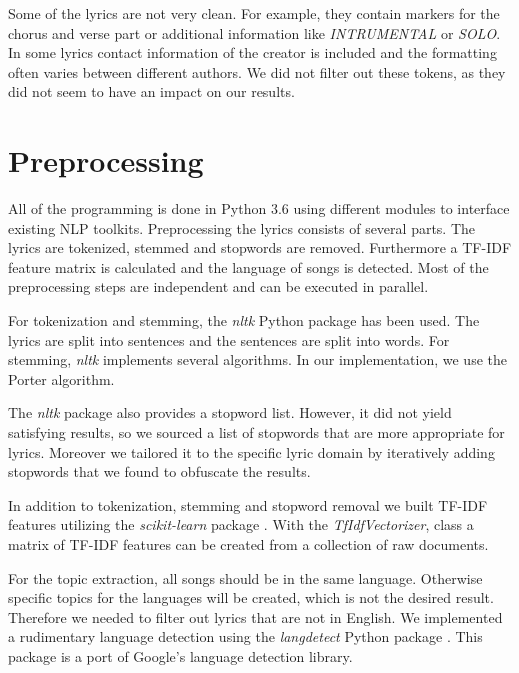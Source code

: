 \documentclass[10pt,a4paper]{article}
\begin{document}
	
	Some of the lyrics are not very clean. For example, they contain markers for the chorus and verse part or additional information like \textit{INTRUMENTAL} or \textit{SOLO}. In some lyrics contact information of the creator is included and the formatting often varies between different authors. We did not filter out these tokens, as they did not seem to have an impact on our results.

	\section{Preprocessing}	
	\label{sec:preprocessing}
	
	All of the programming is done in Python 3.6 using different modules to interface existing NLP toolkits. Preprocessing the lyrics consists of several parts. The lyrics are tokenized, stemmed and stopwords are removed. Furthermore a TF-IDF feature matrix is calculated and the language of songs is detected. Most of the preprocessing steps are independent and can be executed in parallel. 
	
	For tokenization and stemming, the \textit{nltk} Python package \cite{nltk} has been used. The lyrics are split into sentences and the sentences are split into words. For stemming, \textit{nltk} implements several algorithms. In our implementation, we use the Porter algorithm.  
	
	The \textit{nltk} package also provides a stopword list. However, it did not yield satisfying results, so we sourced a list of stopwords that are more appropriate for lyrics. Moreover we tailored it to the specific lyric domain by iteratively adding stopwords that we found to obfuscate the results.
	
	In addition to tokenization, stemming and stopword removal we built TF-IDF features utilizing the \textit{scikit-learn} package \cite{scikit-learn}. With the \textit{TfIdfVectorizer}, class a matrix of TF-IDF features can be created from a collection of raw documents. 
	
	For the topic extraction, all songs should be in the same language. Otherwise specific topics for the languages will be created, which is not the desired result. Therefore we needed to filter out lyrics that are not in English. We implemented a rudimentary language detection using the \textit{langdetect} Python package \cite{langdetect}. This package is a port of Google's language detection library.
	
\end{document}
